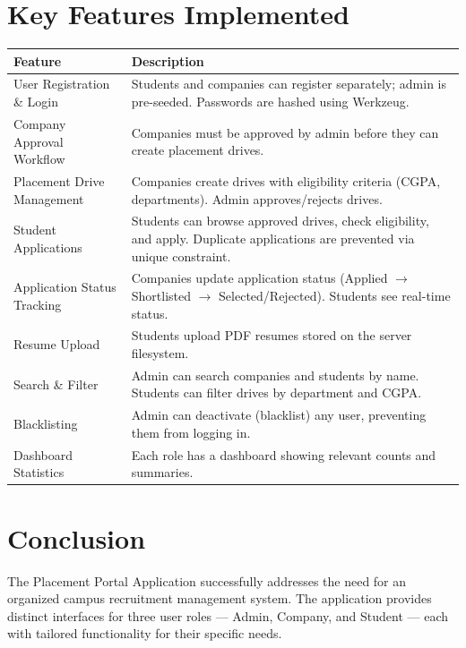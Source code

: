 \documentclass[12pt,a4paper]{article}
\begin{document}
\section{Key Features Implemented}

\begin{tabularx}{\textwidth}{|l|X|}
\hline
\textbf{Feature} & \textbf{Description} \\ \hline
User Registration \& Login & Students and companies can register separately; admin is pre-seeded. Passwords are hashed using Werkzeug. \\ \hline
Company Approval Workflow & Companies must be approved by admin before they can create placement drives. \\ \hline
Placement Drive Management & Companies create drives with eligibility criteria (CGPA, departments). Admin approves/rejects drives. \\ \hline
Student Applications & Students can browse approved drives, check eligibility, and apply. Duplicate applications are prevented via unique constraint. \\ \hline
Application Status Tracking & Companies update application status (Applied $\to$ Shortlisted $\to$ Selected/Rejected). Students see real-time status. \\ \hline
Resume Upload & Students upload PDF resumes stored on the server filesystem. \\ \hline
Search \& Filter & Admin can search companies and students by name. Students can filter drives by department and CGPA. \\ \hline
Blacklisting & Admin can deactivate (blacklist) any user, preventing them from logging in. \\ \hline
Dashboard Statistics & Each role has a dashboard showing relevant counts and summaries. \\ \hline
\end{tabularx}

\section{Conclusion}

The Placement Portal Application successfully addresses the need for an organized campus
recruitment management system. The application provides distinct interfaces for three
user roles --- Admin, Company, and Student --- each with tailored functionality for their
specific needs.
\end{document}
